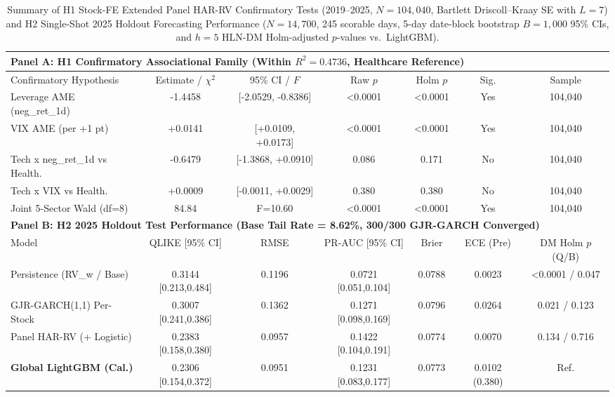 \begin{table}[!t]
\centering
\caption{Summary of H1 Stock-FE Extended Panel HAR-RV Confirmatory Tests (2019--2025, $N=104{,}040$, Bartlett Driscoll--Kraay SE with $L=7$) and H2 Single-Shot 2025 Holdout Forecasting Performance ($N=14{,}700$, 245 scorable days, 5-day date-block bootstrap $B=1{,}000$ 95\% CIs, and $h=5$ HLN-DM Holm-adjusted $p$-values vs.\ LightGBM).}
\label{tab:main_summary}
\scriptsize
\setlength{\tabcolsep}{3.5pt}
\renewcommand{\arraystretch}{1.12}
\begin{tabular}{lcccccc}
\toprule
\multicolumn{7}{l}{\textbf{Panel A: H1 Confirmatory Associational Family (Within $R^2 = 0.4736$, Healthcare Reference)}} \\
\midrule
Confirmatory Hypothesis & Estimate / $\chi^2$ & 95\% CI / $F$ & Raw $p$ & Holm $p$ & Sig. & Sample \\
\midrule
Leverage AME (neg\_ret\_1d) & -1.4458 & [-2.0529, -0.8386] & <0.0001 & <0.0001 & Yes & 104,040 \\
VIX AME (per +1 pt) & +0.0141 & [+0.0109, +0.0173] & <0.0001 & <0.0001 & Yes & 104,040 \\
Tech x neg\_ret\_1d vs Health. & -0.6479 & [-1.3868, +0.0910] & 0.086 & 0.171 & No & 104,040 \\
Tech x VIX vs Health. & +0.0009 & [-0.0011, +0.0029] & 0.380 & 0.380 & No & 104,040 \\
Joint 5-Sector Wald (df=8) & 84.84 & F=10.60 & <0.0001 & <0.0001 & Yes & 104,040 \\
\midrule
\multicolumn{7}{l}{\textbf{Panel B: H2 2025 Holdout Test Performance (Base Tail Rate = 8.62\%, 300/300 GJR-GARCH Converged)}} \\
\midrule
Model & QLIKE [95\% CI] & RMSE & PR-AUC [95\% CI] & Brier & ECE (Pre) & DM Holm $p$ (Q/B) \\
\midrule
Persistence (RV\_w / Base) & 0.3144 [0.213,0.484] & 0.1196 & 0.0721 [0.051,0.104] & 0.0788 & 0.0023 & <0.0001 / 0.047 \\
GJR-GARCH(1,1) Per-Stock & 0.3007 [0.241,0.386] & 0.1362 & 0.1271 [0.098,0.169] & 0.0796 & 0.0264 & 0.021 / 0.123 \\
Panel HAR-RV (+ Logistic) & 0.2383 [0.158,0.380] & 0.0957 & 0.1422 [0.104,0.191] & 0.0774 & 0.0070 & 0.134 / 0.716 \\
\textbf{Global LightGBM (Cal.)} & 0.2306 [0.154,0.372] & 0.0951 & 0.1231 [0.083,0.177] & 0.0773 & 0.0102 (0.380) & Ref. \\
\bottomrule
\end{tabular}
\end{table}
